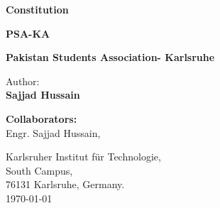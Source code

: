 \begin{titlepage}
\thispagestyle{empty}

\begin{center}
\hbox{}
\vfill

{\usesf\large
{\huge\bfseries Constitution}
\vskip 2.5cm

{\LARGE\bfseries PSA-KA}
\vskip 0.25cm

{\large\bfseries Pakistan Students Association- Karlsruhe\\}

\vskip 1.5cm

Author:  \\
{\large\bfseries Sajjad Hussain\\}

}
\end{center}
\vskip 3cm

\textbf{Collaborators:}  \\
{Engr. Sajjad Hussain,  \\}

\vskip 2cm
Karlsruher Institut für Technologie,\\
South Campus, \\
76131 Karlsruhe, Germany. \\

\vskip 1cm
\rightline\today

\vfill
\end{titlepage}

